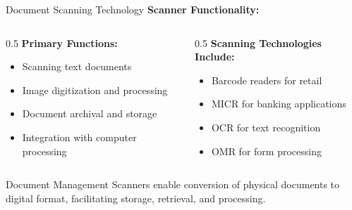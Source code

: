 \documentclass[aspectratio=169]{beamer}
\begin{document}
\begin{frame}{Document Scanning Technology}
    \textbf{Scanner Functionality:} 
    \begin{columns}
        \begin{column}{0.5\textwidth}
            \textbf{Primary Functions:}
            \begin{itemize}
                \item Scanning text documents
                \item Image digitization and processing
                \item Document archival and storage
                \item Integration with computer processing
            \end{itemize}
            
            
        \end{column}
        \begin{column}{0.5\textwidth}
        \textbf{Scanning Technologies Include:}
            \begin{itemize}
                \item Barcode readers for retail
                \item MICR for banking applications
                \item OCR for text recognition
                \item OMR for form processing
            \end{itemize}
        \end{column}
    \end{columns}
    
    \begin{exampleblock}{Document Management}
        Scanners enable conversion of physical documents to digital format, facilitating storage, retrieval, and processing.
    \end{exampleblock}
\end{frame}
\end{document}
